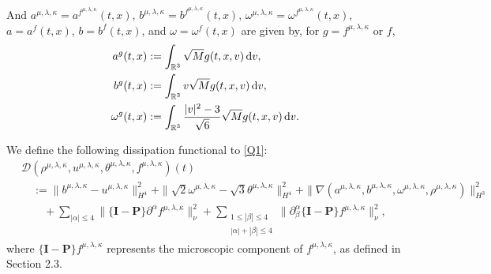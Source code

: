 \documentclass[reqno,11pt]{amsart}
\theoremstyle{plain}
\numberwithin{equation}{section}
\begin{document}
And $a^{\mu,\lambda,\kappa} = a^{f^{\mu,\lambda,\kappa}}(t,x)$,  
$b^{\mu,\lambda,\kappa} = b^{f^{\mu,\lambda,\kappa}}(t,x)$,
$\omega^{\mu,\lambda,\kappa} = \omega^{f^{\mu,\lambda,\kappa}}(t,x)$,  $a = a^{f}(t,x)$, $b = b^f(t,x)$,
 and $\omega = \omega^f(t,x)$ are given by,
for $g=f^{\mu,\lambda,\kappa}$ or $f$,    
\begin{align} 
a^g(t,x) & := \int_{\mathbb{R}^3} \sqrt{M} g(t,x,v) \, {\rm d}v, \\ 
b^g(t,x) & := \int_{\mathbb{R}^3} v \sqrt{M} g(t,x,v) \, {\rm d}v, \label{LNX-b} \\ 
\omega^g(t,x) & := \int_{\mathbb{R}^3} \frac{|v|^2 - 3}{\sqrt{6}} \sqrt{M} g(t,x,v) \, {\rm d}v. \label{omegaa}
\end{align}







 We define the following dissipation functional to \eqref{Q1}:  
\begin{align}  \label{D0} 
&\mathcal{D}(\rho^{\mu,\lambda,\kappa} ,u^{\mu,\lambda,\kappa} ,
\theta^{\mu,\lambda,\kappa} ,f^{\mu,\lambda,\kappa} )(t)\nonumber\\
\,&\quad :=\|b^{\mu,\lambda,\kappa} -u^{\mu,\lambda,\kappa} 
\|_{H^4}^2+\|\sqrt{2}\omega^{\mu,\lambda,\kappa}
 -\sqrt{3}
\theta^{\mu,\lambda,\kappa}\|_{H^4}^2  +\|\nabla (a^{\mu,\lambda,\kappa} ,
b^{\mu,\lambda,\kappa} ,\omega^{\mu,\lambda,\kappa} ,\rho^{\mu,\lambda,\kappa} )\|_{H^3}^2  
 \nonumber \\
&\qquad +\sum_{|\alpha|\leq 4}\|\{\mathbf{I}-\mathbf{P}\}\partial^\alpha 
f^{\mu,\lambda,\kappa} \|_{\nu}^2  +\sum_{\substack{1 \leq | \beta| 
\leq 4\\|\alpha|+|\beta| \leq 4}} \|\partial_\beta^\alpha\{\mathbf{I}-\mathbf{P}\} 
f^{\mu,\lambda,\kappa} \|_\nu^2,  
\end{align}  
where $\{\mathbf{I}-\mathbf{P}\}f^{\mu,\lambda,\kappa}$ represents 
the microscopic component of $f^{\mu,\lambda,\kappa}$, as defined in Section 2.3.




 
\end{document}
